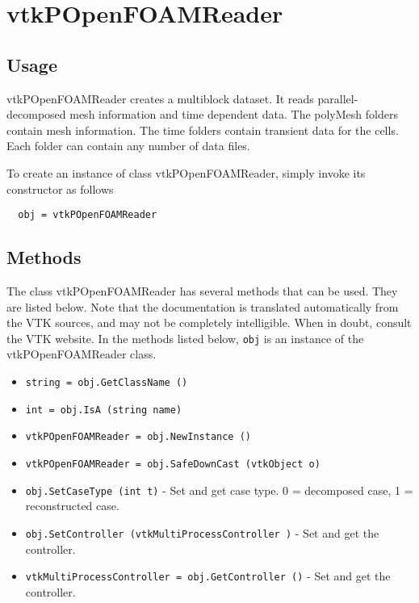 \section{vtkPOpenFOAMReader}

\subsection{Usage}

 vtkPOpenFOAMReader creates a multiblock dataset. It reads
 parallel-decomposed mesh information and time dependent data.  The
 polyMesh folders contain mesh information. The time folders contain
 transient data for the cells. Each folder can contain any number of
 data files.

To create an instance of class vtkPOpenFOAMReader, simply
invoke its constructor as follows
\begin{verbatim}
  obj = vtkPOpenFOAMReader
\end{verbatim}
\subsection{Methods}

The class vtkPOpenFOAMReader has several methods that can be used.
  They are listed below.
Note that the documentation is translated automatically from the VTK sources,
and may not be completely intelligible.  When in doubt, consult the VTK website.
In the methods listed below, \verb|obj| is an instance of the vtkPOpenFOAMReader class.
\begin{itemize}
\item  \verb|string = obj.GetClassName ()|

\item  \verb|int = obj.IsA (string name)|

\item  \verb|vtkPOpenFOAMReader = obj.NewInstance ()|

\item  \verb|vtkPOpenFOAMReader = obj.SafeDownCast (vtkObject o)|

\item  \verb|obj.SetCaseType (int t)| -  Set and get case type. 0 = decomposed case, 1 = reconstructed case.

\item  \verb|obj.SetController (vtkMultiProcessController )| -  Set and get the controller.

\item  \verb|vtkMultiProcessController = obj.GetController ()| -  Set and get the controller.

\end{itemize}
